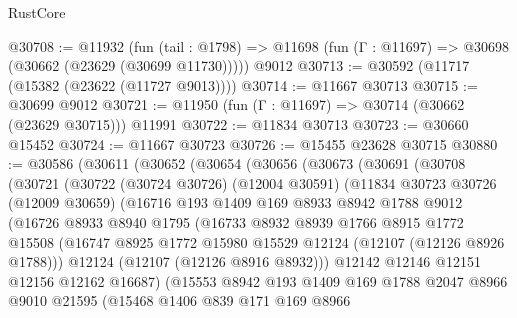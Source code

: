 \begin{lexlean}{RustCore}
\begin{coremodule}
@30708 := @11932
    (fun (tail : @1798) => @11698 (fun (Γ : @11697) => @30698 (@30662 (@23629 (@30699 @11730)))))
    @9012
@30713 := @30592 (@11717 (@15382 (@23622 (@11727 @9013))))
@30714 := @11667 @30713
@30715 := @30699 @9012
@30721 := @11950 (fun (Γ : @11697) => @30714 (@30662 (@23629 @30715))) @11991
@30722 := @11834 @30713
@30723 := @30660 @15452
@30724 := @11667 @30723
@30726 := @15455 @23628 @30715
@30880 := @30586
    (@30611
      (@30652
        (@30654
          (@30656
            (@30673
              (@30691
                (@30708
                  (@30721
                    (@30722
                      (@30724 @30726)
                      (@12004 @30591)
                      (@11834
                        @30723
                        @30726
                        (@12009 @30659)
                        (@16716
                          @193
                          @1409
                          @169
                          @8933
                          @8942
                          @1788
                          @9012
                          (@16726
                            @8933
                            @8940
                            @1795
                            (@16733
                              @8932
                              @8939
                              @1766
                              @8915
                              @1772
                              @15508
                              (@16747
                                @8925
                                @1772
                                @15980
                                @15529
                                @12124
                                (@12107 (@12126 @8926 @1788)))
                              @12124
                              (@12107 (@12126 @8916 @8932)))
                            @12142
                            @12146
                            @12151
                            @12156
                            @12162
                            @16687)
                          (@15553
                            @8942
                            @193
                            @1409
                            @169
                            @1788
                            @2047
                            @8966
                            @9010
                            @21595
                            (@15468
                              @1406
                              @839
                              @171
                              @169
                              @8966

\end{coremodule}
\end{lexlean}
